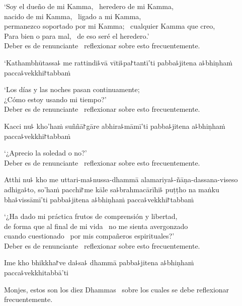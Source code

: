 \begin{english}
  `Soy el dueño de mi Kamma, \pause\ heredero de mi Kamma, \pause\\
  nacido de mi Kamma, \pause\ ligado a mi Kamma, \pause\\
  permanezco soportado por mi Kamma; \pause\ cualquier Kamma que creo, \pause\\
  Para bien o para mal, \pause\ de eso seré el heredero.' \pause\\
  Deber es de renunciante \pause\ reflexionar sobre esto frecuentemente.
\end{english}

\clearpage

`Kathambhūtassa꜕ me rattindi꜕vā vīti꜕pa꜓tantī'ti pabba꜕jitena a꜕bhiṇhaṁ pacca꜕vekkhi꜓tabbaṁ

\begin{english}
  `Los días y las noches pasan continuamente; \pause\\
  ¿Cómo estoy usando mi tiempo?' \pause\\
  Deber es de renunciante \pause\ reflexionar sobre esto frecuentemente.
\end{english}

Kacci nu꜕ kho'haṁ suññā꜓gāre abhira꜕māmī'ti pabba꜕jitena a꜕bhiṇhaṁ pacca꜕vekkhi꜓tabbaṁ

\begin{english}
  `¿Aprecio la soledad o no?' \pause\\
  Deber es de renunciante \pause\ reflexionar sobre esto frecuentemente.
\end{english}

Atthi nu꜕ kho me uttari-ma꜕nussa-dhammā alamariya꜕-ñāṇa-dassana-viseso adhiga꜕to, so'haṁ pacchi꜓me kāle sa꜕brahmacārīhi꜕ puṭṭho na maṅku bha꜕vissāmī'ti pabba꜕jitena a꜕bhiṇhaṁ pacca꜕vekkhi꜓tabbaṁ

\begin{english}
  `¿Ha dado mi práctica frutos de comprensión y libertad, \pause\\ de forma que
  al final de mi vida \pause\ no me sienta avergonzado \pause\\
  cuando cuestionado \pause\ por mis compañeros espirituales?' \pause\\
  Deber es de renunciante \pause\ reflexionar sobre esto frecuentemente.
\end{english}

Ime kho bhikkha꜓ve da꜕sa꜕ dhammā pabba꜕jitena a꜕bhiṇhaṁ pacca꜕vekkhitabbā'ti

\begin{english}
  Monjes, estos son los diez Dhammas \pause\ sobre los cuales se debe reflexionar frecuentemente.
\end{english}

